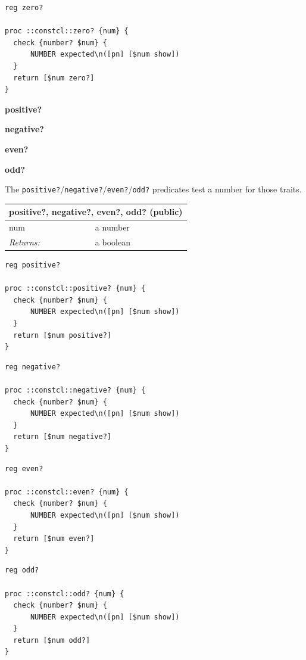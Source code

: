 \documentclass[twoside,9pt]{report}
\begin{document}
\noindent\makebox[\linewidth]{\rule{\linewidth}{0.4pt}}
\begin{lstlisting}
reg zero?
 
proc ::constcl::zero? {num} {
  check {number? $num} {
      NUMBER expected\n([pn] [$num show])
  }
  return [$num zero?]
}
\end{lstlisting}
\noindent\makebox[\linewidth]{\rule{\linewidth}{0.4pt}}

\textbf{positive?}


\textbf{negative?}


\textbf{even?}


\textbf{odd?}


The \texttt{positive?}/\texttt{negative?}/\texttt{even?}/\texttt{odd?} predicates test a number for those traits.

\begin{tabular}{ |l l| }
\hline
\multicolumn{2}{|l|}{positive?, negative?, even?, odd? (public)} \\
\hline
num & a number \\
\textit{Returns:} & a boolean \\
\hline
\end{tabular}

\noindent\makebox[\linewidth]{\rule{\linewidth}{0.4pt}}
\begin{lstlisting}
reg positive?
 
proc ::constcl::positive? {num} {
  check {number? $num} {
      NUMBER expected\n([pn] [$num show])
  }
  return [$num positive?]
}
\end{lstlisting}
\noindent\makebox[\linewidth]{\rule{\linewidth}{0.4pt}}
\noindent\makebox[\linewidth]{\rule{\linewidth}{0.4pt}}
\begin{lstlisting}
reg negative?
 
proc ::constcl::negative? {num} {
  check {number? $num} {
      NUMBER expected\n([pn] [$num show])
  }
  return [$num negative?]
}
\end{lstlisting}
\noindent\makebox[\linewidth]{\rule{\linewidth}{0.4pt}}
\noindent\makebox[\linewidth]{\rule{\linewidth}{0.4pt}}
\begin{lstlisting}
reg even?
 
proc ::constcl::even? {num} {
  check {number? $num} {
      NUMBER expected\n([pn] [$num show])
  }
  return [$num even?]
}
\end{lstlisting}
\noindent\makebox[\linewidth]{\rule{\linewidth}{0.4pt}}
\noindent\makebox[\linewidth]{\rule{\linewidth}{0.4pt}}
\begin{lstlisting}
reg odd?
 
proc ::constcl::odd? {num} {
  check {number? $num} {
      NUMBER expected\n([pn] [$num show])
  }
  return [$num odd?]
}
\end{lstlisting}
\noindent\makebox[\linewidth]{\rule{\linewidth}{0.4pt}}
\end{document}
